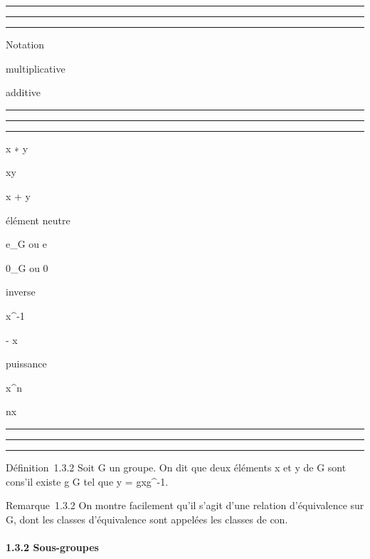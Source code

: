 \documentclass[]{article}
\begin{document}
\begin{center}\rule{3in}{0.4pt}\end{center}

\begin{center}\rule{3in}{0.4pt}\end{center}

\begin{center}\rule{3in}{0.4pt}\end{center}

Notation

multiplicative

additive

\begin{center}\rule{3in}{0.4pt}\end{center}

\begin{center}\rule{3in}{0.4pt}\end{center}

\begin{center}\rule{3in}{0.4pt}\end{center}

x ∗ y

xy

x + y

élément neutre

e\_G ou e

0\_G ou 0

inverse

x^-1

- x

puissance

x^n

nx

\begin{center}\rule{3in}{0.4pt}\end{center}

\begin{center}\rule{3in}{0.4pt}\end{center}

\begin{center}\rule{3in}{0.4pt}\end{center}

Définition~1.3.2 Soit G un groupe. On dit que deux éléments x et y de G
sont con s'il existe g \in G tel que y = gxg^-1.

Remarque~1.3.2 On montre facilement qu'il s'agit d'une relation
d'équivalence sur G, dont les classes d'équivalence sont appelées les
classes de con\jmathugaison.

\paragraph{1.3.2 Sous-groupes}
\end{document}
